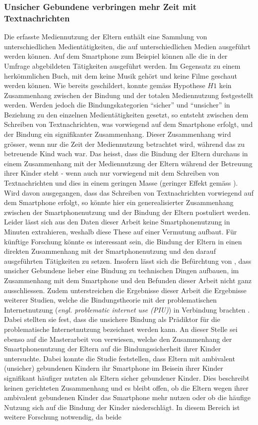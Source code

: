 \subsubsection{Unsicher Gebundene verbringen mehr Zeit mit Textnachrichten}
Die erfasste Mediennutzung der Eltern enthält eine Sammlung von unterschiedlichen Medientätigkeiten, die auf unterschiedlichen Medien ausgeführt werden können. Auf dem Smartphone zum Beispiel können alle die in der Umfrage abgebildeten Tätigkeiten ausgeführt werden. Im Gegensatz zu einem herkömmlichen Buch, mit dem keine Musik gehört und keine Filme geschaut werden können. Wie bereits geschildert, konnte gemäss Hypothese $H1$ kein Zusammenhang zwischen der Bindung und der totalen Mediennutzung festgestellt werden. Werden jedoch die Bindungskategorien \enquote{sicher} und \enquote{unsicher} in Beziehung zu den einzelnen Medientätigkeiten gesetzt, so entsteht zwischen dem Schreiben von Textnachrichten, was vorwiegend auf dem Smartphone erfolgt, und der Bindung ein signifikanter Zusammenhang. Dieser Zusammen\-hang wird grösser, wenn nur die Zeit der Mediennutzung betrachtet wird, während das zu betreuende Kind wach war. Das heisst, dass die Bindung der Eltern durchaus in einem Zusammen\-hang mit der Mediennutzung der Eltern während der Betreuung ihrer Kinder steht - wenn auch nur vorwiegend mit dem Schreiben von Textnachrichten und dies in einem geringen Masse (geringer Effekt gemäss ). Wird davon ausgegangen, dass das Schreiben von Textnachrichten vorwiegend auf dem Smartphone erfolgt, so könnte hier ein generealisierter Zusammenhang zwischen der Smartphonenutzung und der Bindung der Eltern postuliert werden. Leider lässt sich aus den Daten dieser Arbeit keine Smartphonenutzung in Minuten extrahieren, weshalb diese These auf einer Vermutung aufbaut. Für künftige Forschung könnte es interessant sein, die Bindung der Eltern in einen direkten Zusammen\-hang mit der Smartphonenutzung und den darauf ausgeführten Tätigkeiten zu setzen. Insofern lässt sich die Befürchtung von , dass unsicher Gebundene lieber eine Bindung zu technischen Dingen aufbauen, im Zusammenhang mit dem Smartphone und den Befunden dieser Arbeit nicht ganz ausschliessen. Zudem unterstreichen die Ergebnisse dieser Arbeit die Ergebnisse weiterer Studien, welche die Bindungstheorie mit der problematischen Internet\-nutzung (\textit{engl. problematic internet use (PIU)}) in Verbindung brachten \cite{Jia2016, Chang2015, Lin2011a}. Dabei stellten sie fest, dass die unsichere Bindung als Prädiktor für die problematische Internetnutzung bezeichnet werden kann. An dieser Stelle sei ebenso auf die Masterarbeit von  verwiesen, welche den Zusammenhang der Smartphonenutzung der Eltern auf die Bindungssicherheit ihrer Kinder untersuchte. Dabei konnte die Studie feststellen, dass Eltern mit ambivalent (unsicher) gebundenen Kindern ihr Smartphone im Beisein ihrer Kinder signifikant häufiger nutzten als Eltern sicher gebundener Kinder. Dies beschreibt keinen gerichteten Zusammenhang und es bleibt offen, ob die Eltern wegen ihrer ambivalent gebundenen Kinder das Smartphone mehr nutzen oder ob die häufige Nutzung sich auf die Bindung der Kinder niederschlägt. In diesem Bereich ist weitere Forschung notwendig, da beide 